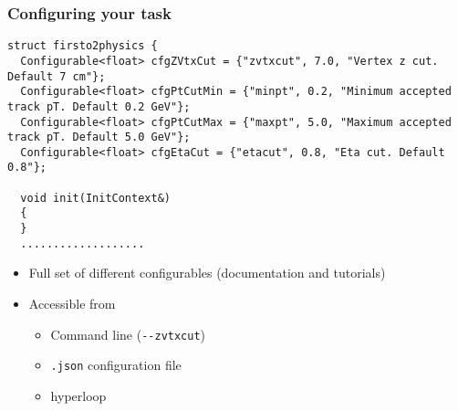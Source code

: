 \documentclass[14pt,aspectratio=169,t]{beamer}
\begin{document}
\begin{frame}[fragile]
  \frametitle{Configuring your task}
  \vspace{-0.0in}
  {\scriptsize \color{blue}
  \begin{verbatim}
struct firsto2physics {
  Configurable<float> cfgZVtxCut = {"zvtxcut", 7.0, "Vertex z cut. Default 7 cm"};
  Configurable<float> cfgPtCutMin = {"minpt", 0.2, "Minimum accepted track pT. Default 0.2 GeV"};
  Configurable<float> cfgPtCutMax = {"maxpt", 5.0, "Maximum accepted track pT. Default 5.0 GeV"};
  Configurable<float> cfgEtaCut = {"etacut", 0.8, "Eta cut. Default 0.8"};

  void init(InitContext&)
  {
  }
  ...................
  \end{verbatim}}
  \vspace{-0.3in}
  \begin{itemize}
    \small
    \item Full set of different configurables (documentation and tutorials)
    \item Accessible from
    \begin{itemize}
      \item Command line (\verb|--zvtxcut|)
      \item \verb|.json| configuration file
      \item hyperloop
    \end{itemize}
  \end{itemize}
\end{frame}
\end{document}

